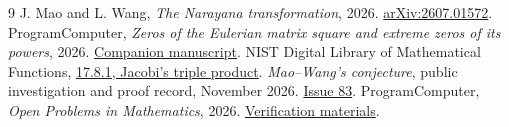 \documentclass[11pt]{article}
\begin{document}
\begin{thebibliography}{9}
 J. Mao and L. Wang, \emph{The Narayana transformation}, 2026. \href{https://arxiv.org/abs/2607.01572}{arXiv:2607.01572}.
 ProgramComputer, \emph{Zeros of the Eulerian matrix square and extreme zeros of its powers}, 2026. \href{https://github.com/ProgramComputer/open-math-research/blob/adaf65207ac972d491e8759b83ef07c5d483401d/topics/eulerian-matrix-square/paper.pdf}{Companion manuscript}.
 NIST Digital Library of Mathematical Functions, \href{https://dlmf.nist.gov/17.8.E1}{17.8.1, Jacobi's triple product}.
 \emph{Mao--Wang's conjecture}, public investigation and proof record, November 2026. \href{https://github.com/1337isnot1337/solved-conjectures/issues/83}{Issue 83}.
 ProgramComputer, \emph{Open Problems in Mathematics}, 2026. \href{https://github.com/ProgramComputer/open-math-research/tree/main/topics/eulerian-matrix-square}{Verification materials}.
\end{thebibliography}
\end{document}

